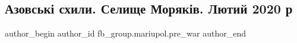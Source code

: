  
 
 
 
 

\subsection{Азовські схили. Селище Моряків. Лютий 2020 р}
\label{sec:09_02_2023.fb.fb_group.mariupol.pre_war.9.azovsk__skhili__seli}

\ifcmt
 author_begin
   author_id fb_group.mariupol.pre_war
 author_end
\fi
